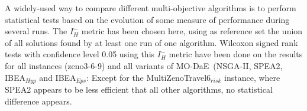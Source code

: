 \documentclass{llncs}
\def\MODAE{{\sc MO-DaE}}
\begin{document}
A widely-used way to compare different multi-objective algorithms is to perform statistical tests based on the evolution of some measure of performance during several runs. The $I^-_H $ metric has been chosen here, using as reference set the union of all solutions found by at least one run of one algorithm.
Wilcoxon signed rank tests with confidence level 0.05 using this $I^-_H $ metric have been done on the results for all instances (zeno3-6-9) and all variants of \MODAE\ (NSGA-II, SPEA2, IBEA$_{Hyp}$ and IBEA$_{Eps}$: Except for the MultiZenoTravel6$_{risk}$ instance, where  SPEA2 appears to be less efficient that all other algorithms, 
no statistical difference appears. 
\begin{figure}[h]
\end{figure}
\end{document}
